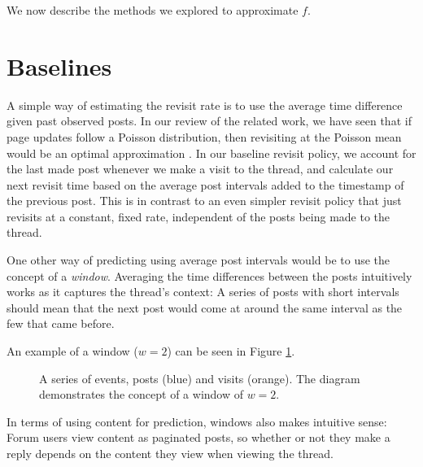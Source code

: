 We now describe the methods we explored to approximate $f$.

\section{Baselines}
A simple way of estimating the revisit rate is to use the average time 
difference given past observed posts. In our review of the related work, we 
have seen that if page updates follow a Poisson distribution, then revisiting at 
the Poisson mean would be an optimal approximation \cite{Coffman1997}.
In our baseline revisit policy, we account for the last made post whenever 
we make a visit to the thread, and calculate our next revisit time based on the 
average post intervals added to the timestamp of the previous post. This is in 
contrast to an even simpler revisit policy that just revisits at a constant, 
fixed rate, independent of the posts being made to the thread.

One other way of predicting using average post intervals would be to use the 
concept of a \emph{window}. Averaging the time differences between the posts 
intuitively works as it captures the thread's context: A series of posts with 
short intervals should mean that the next post would come at around the same 
interval as the few that came before.

An example of a window ($w=2$) can be seen in Figure \ref{fig:event_series}.

\begin{figure}
	\begin{center}
	
	\caption{%
A series of events, posts (blue) and visits (orange).  The diagram demonstrates 
the concept of a window of $w=2$.
}\label{fig:event_series}
	\end{center}
\end{figure}

In terms of using content for prediction, windows also makes intuitive sense: 
Forum users view content as paginated posts, so whether or not they make a reply 
depends on the content they view when viewing the thread.  


